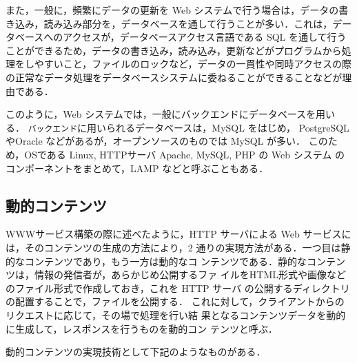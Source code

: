 また，一般に，頻繁にデータの更新を Web システムで行う場合は，データの書
き込み，読み込み部分を，データベースを通して行うことが多い．これは，デー
タベースへのアクセスが，データベースアクセス言語である SQL を通して行う
ことができるため，データの書き込み，読み込み，更新などがプログラムから処
理をしやすいこと，ファイルのロックなど，データの一貫性や同時アクセスの際
の正常なデータ処理をデータベースシステムに委ねることができることなどが理
由である．

このように，Web システムでは，一般にバックエンドにデータベースを用いる．
\texttt{バックエンド}に用いられるデータベースは，MySQL をはじめ，
PostgreSQL やOracle などがあるが，オープンソースのものでは MySQL が多い．
このため，OSである Linux, HTTPサーバ Apache, MySQL, PHP の Web システム
のコンポーネントをまとめて，LAMP などと呼ぶこともある．

\subsection{動的コンテンツ}

WWWサービス構築の際に述べたように，HTTP サーバによる Web サービスには，そのコンテンツの生成の方法により，2 
通りの実現方法がある．一つ目は静的なコンテンツであり，もう一方は動的なコ
ンテンツである．静的なコンテンツは，情報の発信者が，あらかじめ公開するファ
イルをHTML形式や画像などのファイル形式で作成しておき，これを HTTP サーバ
の公開するディレクトリの配置することで，ファイルを公開する．
これに対して，クライアントからのリクエストに応じて，その場で処理を行い結
果となるコンテンツデータを動的に生成して，レスポンスを行うものを動的コン
テンツと呼ぶ．

動的コンテンツの実現技術として下記のようなものがある．

